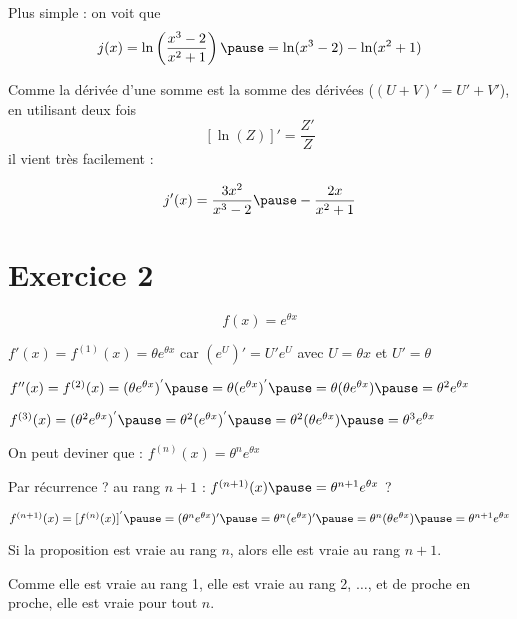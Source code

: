 \documentclass[9pt,handout,professionalfonts,hyperref]{beamer}
\begin{document}
\begin{frame}
Plus simple : on voit que $$j(x)=\ln\left(\dfrac{x^3-2}{x^2+1}\right)\pause=\ln(x^3-2)-\ln(x^2+1)$$
 \pause
\medskip
 
Comme la dérivée d'une somme est la somme des dérivées ($(U+V)' = U'+V'$), en utilisant deux fois $$[\ln(Z)]'=\frac{Z'}{Z}$$ il vient très facilement :

$$
j'(x)=\frac{3x^2}{x^3-2}\pause -\frac{2x}{x^2+1}
$$
\end{frame}

\section{Exercice 2}

\begin{frame}

$$f(x)=e^{\theta x}$$
\pause

$f'(x)=f^{(1)}(x)=\theta e^{\theta x}$ \pause car $(e^U)'=U'e^U$ \pause avec $U=\theta x$ \pause et $U'=\theta$
\pause
\medskip

$f''(x)=f^{(2)}(x)=(\theta e^{\theta x})^{'}\pause =\theta(e^{\theta x})^{'} \pause =\theta (\theta e^{\theta x}) \pause = \theta^2 e^{\theta x}$
 \pause
\medskip

$f^{(3)}(x)=(\theta^2 e^{\theta x})^{'}\pause = \theta^2(e^{\theta x})^{'} \pause =\theta^2 (\theta e^{\theta x}) \pause =\theta^3 e^{\theta x}$
 \pause
\medskip

On peut deviner que : $f^{(n)}(x)=\theta^n e^{\theta x}$
 \pause
\medskip

Par récurrence ? \pause au rang $n+1$ : \pause \alert{$f^{(n+1)}(x)\pause =\theta^{n+1} e^{\theta x}$} ?
 \pause
\medskip

$f^{(n+1)}(x)=[f^{(n)}(x)]^{'}\pause =(\theta^n  e^{\theta x})'\pause =\theta^n  (e^{\theta x})'\pause =\theta^n (\theta e^{\theta x})\pause =\theta^{n+1} e^{\theta x} $\newline 

Si la proposition est vraie au rang $n$, alors elle est vraie au rang $n+1$. 

Comme elle est vraie au rang 1, elle est vraie au rang 2, $\dots$, et de proche en proche, elle est vraie pour tout $n$. 

\end{frame}
\end{document}
